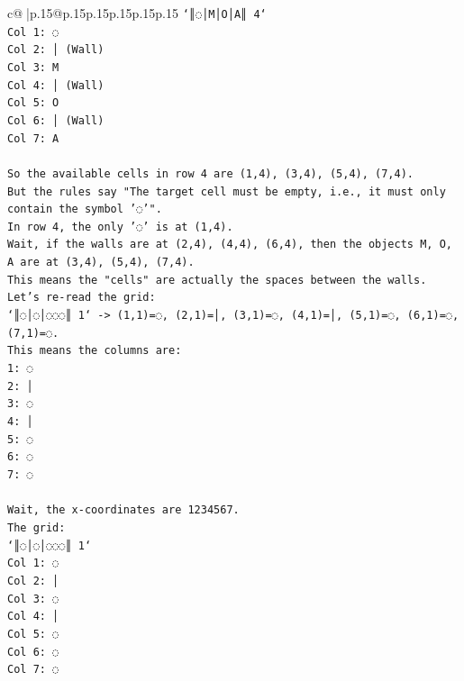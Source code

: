 \documentclass{article}
\begin{document}
{\begin{supertabular}{c@{$\;$}|p{.15\linewidth}@{}p{.15\linewidth}p{.15\linewidth}p{.15\linewidth}p{.15\linewidth}p{.15\linewidth}}
{{{\texttt{`║◌│M│O│A║ 4`} \\
\texttt{Col 1: ◌} \\
\texttt{Col 2: │ (Wall)} \\
\texttt{Col 3: M} \\
\texttt{Col 4: │ (Wall)} \\
\texttt{Col 5: O} \\
\texttt{Col 6: │ (Wall)} \\
\texttt{Col 7: A} \\
\\ 
\texttt{So the available cells in row 4 are (1,4), (3,4), (5,4), (7,4).} \\
\texttt{But the rules say "The target cell must be empty, i.e., it must only contain the symbol '◌'".} \\
\texttt{In row 4, the only '◌' is at (1,4).} \\
\texttt{Wait, if the walls are at (2,4), (4,4), (6,4), then the objects M, O, A are at (3,4), (5,4), (7,4).} \\
\texttt{This means the "cells" are actually the spaces between the walls.} \\
\texttt{Let's re{-}read the grid:} \\
\texttt{`║◌│◌│◌◌◌║ 1` {-}> (1,1)=◌, (2,1)=│, (3,1)=◌, (4,1)=│, (5,1)=◌, (6,1)=◌, (7,1)=◌.} \\
\texttt{This means the columns are:} \\
\texttt{1: ◌} \\
\texttt{2: │} \\
\texttt{3: ◌} \\
\texttt{4: │} \\
\texttt{5: ◌} \\
\texttt{6: ◌} \\
\texttt{7: ◌} \\
\\ 
\texttt{Wait, the x{-}coordinates are 1234567.} \\
\texttt{The grid:} \\
\texttt{`║◌│◌│◌◌◌║ 1`} \\
\texttt{Col 1: ◌} \\
\texttt{Col 2: │} \\
\texttt{Col 3: ◌} \\
\texttt{Col 4: │} \\
\texttt{Col 5: ◌} \\
\texttt{Col 6: ◌} \\
\texttt{Col 7: ◌} \\
\\ 
}}}
\end{supertabular}}
\end{document}
